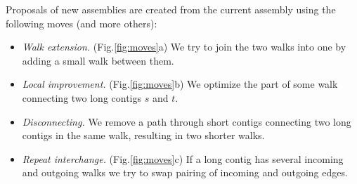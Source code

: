 Proposals of new assemblies are created from the current assembly
using the following moves (and more others):
\begin{itemize}
\item \emph{Walk extension.} (Fig.\ref{fig:moves}a)
  We try to join the two walks into one by adding a small walk between them.
\item \emph{Local improvement.} (Fig.\ref{fig:moves}b)
  We optimize the
  part of some walk connecting two long contigs $s$ and $t$.
\item \emph{Disconnecting.} We remove a path through short contigs 
  connecting two long contigs in the same walk, resulting in two
  shorter walks.
\item \emph{Repeat interchange.} (Fig.\ref{fig:moves}c) 
  If a long contig has several incoming and outgoing walks
  we try to swap pairing of incoming and outgoing edges.
\end{itemize}

